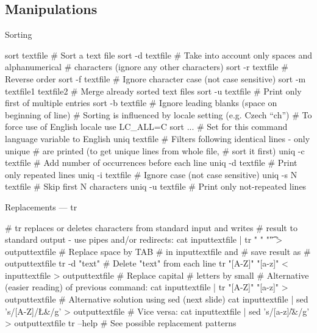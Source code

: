 \documentclass[hyperref={bookmarks=true, unicode=true, colorlinks=true, pdftitle={Linux, command line and MetaCentrum}, plainpages=false, pdfauthor={Vojtech Zeisek}, pdfsubject={Course about use of Linux command line, writing shell scripts and using MetaCentrum of CESNET}, pdfcreator={XeLaTeX, http://www.xelatex.org/}, pdfkeywords={Linux, GNU, BASH, shell, command line, MetaCentrum}, linkcolor=Sienna, anchorcolor=black, citecolor=green, filecolor=magenta, menucolor=Sienna, urlcolor=cyan, pdftex}, compress, ucs, xelatex, xcolor=svgnames, 11pt]{beamer}
\begin{document}
\subsection{Manipulations}

\begin{frame}[fragile]{Sorting}
  \begin{bashcode}
    sort textfile # Sort a text file
    sort -d textfile # Take into account only spaces and alphanumerical
                     # characters (ignore any other characters)
    sort -r textfile # Reverse order
    sort -f textfile # Ignore character case (not case sensitive)
    sort -m textfile1 textfile2 # Merge already sorted text files
    sort -u textfile # Print only first of multiple entries
    sort -b textfile # Ignore leading blanks (space on beginning of line)
    # Sorting is influenced by locale setting (e.g. Czech ``ch'')
    # To force use of English locale use
    LC_ALL=C sort ... # Set for this command language variable to English
    uniq textfile # Filters following identical lines - only unique
                  # are printed (to get unique lines from whole file,
                  # sort it first)
    uniq -c textfile # Add number of occurrences before each line
    uniq -d textfile # Print only repeated lines
    uniq -i textfile # Ignore case (not case sensitive)
    uniq -s N textfile # Skip first N characters
    uniq -u textfile # Print only not-repeated lines
  \end{bashcode}
\end{frame}

\begin{frame}[fragile]{Replacements --- tr}
  \begin{bashcode}
    # tr replaces or deletes characters from standard input and writes
    # result to standard output - use pipes and/or redirects:
    cat inputtextfile | tr " " "\t" > outputtextfile # Replace space by TAB
                                                     # in inputtextfile and
                                                     # save result as
                                                     # outputtextfile
    tr -d "text" # Delete "text" from each line
    tr "[A-Z]" "[a-z]" < inputtextfile > outputtextfile # Replace capital
                                                        # letters by small
    # Alternative (easier reading) of previous command:
    cat inputtextfile | tr "[A-Z]" "[a-z]" > outputtextfile
    # Alternative solution using sed (next slide)
    cat inputtextfile | sed 's/[A-Z]/\L&/g' > outputtextfile # Vice versa:
    cat inputtextfile | sed 's/[a-z]/\U&/g' > outputtextfile
    tr --help # See possible replacement patterns
  \end{bashcode}
\end{frame}
\end{document}
